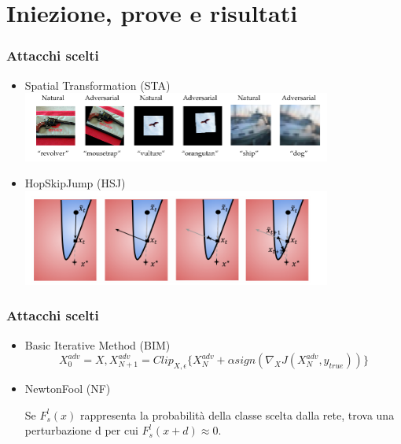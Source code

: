 \documentclass{beamer}
\begin{document}
\section{Iniezione, prove e risultati}
\begin{frame}
    \frametitle{Attacchi scelti}

            \begin{itemize}
               
                \item    Spatial Transformation (STA)
                    \includegraphics[width=0.8\textwidth]{spat.png}
                \item HopSkipJump (HSJ)
                    \includegraphics[width=0.8\textwidth]{hop.png}
                
            \end{itemize}
        
        

\end{frame}


\begin{frame}
    \frametitle{Attacchi scelti}
    \begin{itemize}
        \item Basic Iterative Method (BIM)
        \[X^{adv}_{0} = X, X^{adv}_{N+1} = Clip_{X,\epsilon}\{ X^{adv}_{N} + \alpha sign(\nabla _{X}J(X^{adv}_{N},y_{true})) \}\]
        \item NewtonFool (NF)
        
        Se $ F^l_s(x)$ rappresenta la probabilità della classe scelta dalla rete, trova una perturbazione d per cui $F^l_s(x + d) \approx 0$.
    \end{itemize}
\end{frame}
\end{document}
